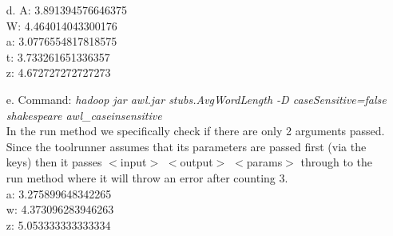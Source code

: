 \documentclass{article}
\begin{document}
\begin{itemize}
\begin{itemize}
	\item[d.] %
		A: 3.891394576646375\\
		W: 4.464014043300176\\
		a: 3.0776554817818575\\
		t: 3.733261651336357\\
		z: 4.672727272727273\\
	\item[e.] 
		Command: \textit{hadoop jar awl.jar stubs.AvgWordLength -D caseSensitive=false shakespeare awl\_caseinsensitive} \\
		In the run method we specifically check if there are only 2 arguments passed. Since the toolrunner assumes that its parameters are passed first (via the keys) then it passes $<$input$>$ $<$output$>$ $<$params$>$ through to the run method where it will throw an error after counting 3.\\
		a: 3.275899648342265\\
		w: 4.373096283946263\\
		z: 5.053333333333334\\
	\end{itemize}
	
\pagebreak


\end{itemize}
\end{document}
